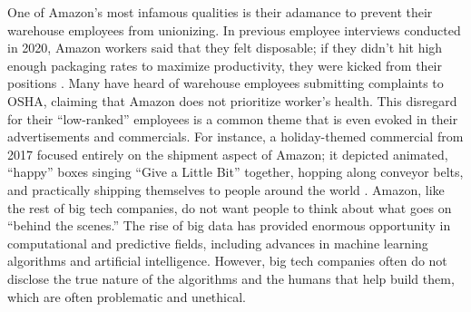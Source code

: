 \documentclass[twoside]{article}
\begin{document}
One of Amazon’s most infamous qualities is their adamance to prevent their warehouse employees from unionizing. In previous employee interviews conducted in 2020, Amazon workers said that they felt disposable; if they didn’t hit high enough packaging rates to maximize productivity, they were kicked from their positions \cite{amazon1}. Many have heard of warehouse employees submitting complaints to OSHA, claiming that Amazon does not prioritize worker’s health. This disregard for their “low-ranked” employees is a common theme that is even evoked in their advertisements and commercials. For instance, a holiday-themed commercial from 2017 focused entirely on the shipment aspect of Amazon; it depicted animated, “happy” boxes singing “Give a Little Bit” together, hopping along conveyor belts, and practically shipping themselves to people around the world \cite{amazon2}. Amazon, like the rest of big tech companies, do not want people to think about what goes on “behind the scenes.” The rise of big data has provided enormous opportunity in computational and predictive fields, including advances in machine learning algorithms and artificial intelligence. However, big tech companies often do not disclose the true nature of the algorithms and the humans that help build them, which are often problematic and unethical.
\end{document}
